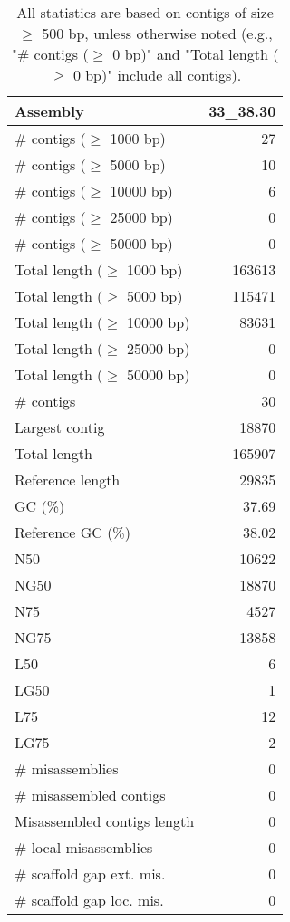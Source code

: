 \documentclass[12pt,a4paper]{article}
\begin{document}
\begin{table}[ht]
\begin{center}
\caption{All statistics are based on contigs of size $\geq$ 500 bp, unless otherwise noted (e.g., "\# contigs ($\geq$ 0 bp)" and "Total length ($\geq$ 0 bp)" include all contigs).}
\begin{tabular}{|l*{1}{|r}|}
\hline
Assembly & 33\_38.30 \\ \hline
\# contigs ($\geq$ 1000 bp) & 27 \\ \hline
\# contigs ($\geq$ 5000 bp) & 10 \\ \hline
\# contigs ($\geq$ 10000 bp) & 6 \\ \hline
\# contigs ($\geq$ 25000 bp) & 0 \\ \hline
\# contigs ($\geq$ 50000 bp) & 0 \\ \hline
Total length ($\geq$ 1000 bp) & 163613 \\ \hline
Total length ($\geq$ 5000 bp) & 115471 \\ \hline
Total length ($\geq$ 10000 bp) & 83631 \\ \hline
Total length ($\geq$ 25000 bp) & 0 \\ \hline
Total length ($\geq$ 50000 bp) & 0 \\ \hline
\# contigs & 30 \\ \hline
Largest contig & 18870 \\ \hline
Total length & 165907 \\ \hline
Reference length & 29835 \\ \hline
GC (\%) & 37.69 \\ \hline
Reference GC (\%) & 38.02 \\ \hline
N50 & 10622 \\ \hline
NG50 & 18870 \\ \hline
N75 & 4527 \\ \hline
NG75 & 13858 \\ \hline
L50 & 6 \\ \hline
LG50 & 1 \\ \hline
L75 & 12 \\ \hline
LG75 & 2 \\ \hline
\# misassemblies & 0 \\ \hline
\# misassembled contigs & 0 \\ \hline
Misassembled contigs length & 0 \\ \hline
\# local misassemblies & 0 \\ \hline
\# scaffold gap ext. mis. & 0 \\ \hline
\# scaffold gap loc. mis. & 0 \\ \hline

\end{tabular}
\end{center}
\end{table}
\end{document}
